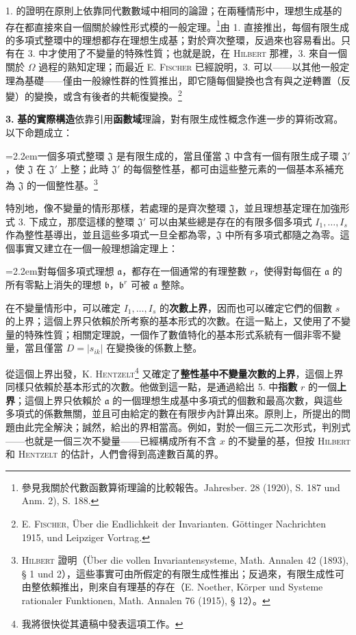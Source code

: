 \documentclass[11pt]{article}
\newcommand{\D}{\mathit D}
\newcommand{\ma}{\mathfrak a}
\newcommand{\mb}{\mathfrak b}
\newcommand{\mJ}{\mathfrak J}
\newcommand{\srcemph}[1]{\textbf{#1}}
\newcommand{\srcname}[1]{\textsc{#1}}
\newcommand{\PXXIIIitem}[2]{\par\noindent\hangindent=2.2em\hangafter=1\makebox[2.2em][l]{#1.}#2\par}
\begin{document}
1. 的證明在原則上依靠同代數數域中相同的論證；在兩種情形中，理想生成基的存在都直接來自一個關於線性形式模的一般定理。\footnote{參見我關於代數函數算術理論的比較報告。Jahresber. 28 (1920), S. 187 und Anm. 2), S. 188.}由 1. 直接推出，每個有限生成的多項式整環中的理想都存在理想生成基；對於齊次整環，反過來也容易看出。只有在 3. 中才使用了不變量的特殊性質；也就是說，在 \srcname{Hilbert} 那裡，3. 來自一個關於 $\Omega$ 過程的熟知定理；而最近 E. \srcname{Fischer} 已經說明，3. 可以——以其他一般定理為基礎——僅由一般線性群的性質推出，即它隨每個變換也含有與之逆轉置（反變）的變換，或含有後者的共軛復變換。\footnote{E. \textsc{Fischer}, Über die Endlichkeit der Invarianten. Göttinger Nachrichten 1915, und Leipziger Vortrag.}

\textbf{3.} \srcemph{基的實際構造}依靠引用\srcemph{函數域}理論，對有限生成性概念作進一步的算術改寫。以下命題成立：
\PXXIIIitem{4}{一個多項式整環 $\mJ$ 是有限生成的，當且僅當 $\mJ$ 中含有一個有限生成子環 $\mJ'$，使 $\mJ$ 在 $\mJ'$ 上整；此時 $\mJ'$ 的每個整性基，都可由這些整元素的一個基本系補充為 $\mJ$ 的一個整性基。\footnote{\textsc{Hilbert} 證明（Über die vollen Invariantensysteme, Math. Annalen 42 (1893), § 1 und 2），這些事實可由所假定的有限生成性推出；反過來，有限生成性可由整依賴推出，則來自有理基的存在（E. Noether, Körper und Systeme rationaler Funktionen, Math. Annalen 76 (1915), § 12）。}}
特別地，像不變量的情形那樣，若處理的是齊次整環 $\mJ$，並且理想基定理在加強形式 3. 下成立，那麼這樣的整環 $\mJ'$ 可以由某些總是存在的有限多個多項式 $I_1,\ldots,I_s$ 作為整性基導出，並且這些多項式一旦全都為零，$\mJ$ 中所有多項式都隨之為零。這個事實又建立在一個一般理想論定理上：
\PXXIIIitem{5}{對每個多項式理想 $\ma$，都存在一個通常的有理整數 $r$，使得對每個在 $\ma$ 的所有零點上消失的理想 $\mb$，$\mb^r$ 可被 $\ma$ 整除。}

在不變量情形中，可以確定 $I_1,\ldots,I_s$ 的\srcemph{次數上界}，因而也可以確定它們的個數 $s$ 的上界；這個上界只依賴於所考察的基本形式的次數。在這一點上，又使用了不變量的特殊性質；相關定理說，一個作了數值特化的基本形式系統有一個非零不變量，當且僅當 $\D=|s_{ik}|$ 在變換後的係數上整。

從這個上界出發，K. \srcname{Hentzelt}\footnote{我將很快從其遺稿中發表這項工作。} 又確定了\srcemph{整性基中不變量次數的上界}，這個上界同樣只依賴於基本形式的次數。他做到這一點，是通過給出 5. 中\srcemph{指數} $r$ 的一個\srcemph{上界}；這個上界只依賴於 $\ma$ 的一個理想生成基中多項式的個數和最高次數，與這些多項式的係數無關，並且可由給定的數在有限步內計算出來。原則上，所提出的問題由此完全解決；誠然，給出的界相當高。例如，對於一個三元二次形式，判別式——也就是一個三次不變量——已經構成所有不含 $x$ 的不變量的基，但按 \srcname{Hilbert} 和 \srcname{Hentzelt} 的估計，人們會得到高達數百萬的界。
\end{document}

